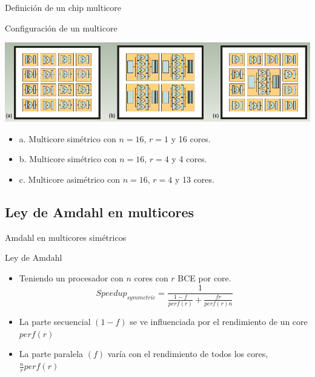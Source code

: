 \documentclass[utf8]{beamer}
\begin{document}
\begin{frame}[allowframebreaks]{Definición de un chip multicore}
\begin{block}{Configuración de un multicore}
\begin{center}
            \includegraphics[width=\linewidth]{figures/clasificacion_multicore}
        \end{center}
        \begin{itemize}
            \item a. Multicore simétrico con $n=16$, $r=1$ y 16 cores.
            \item b. Multicore simétrico con $n=16$, $r=4$ y 4 cores.
            \item c. Multicore asimétrico con $n=16$, $r=4$ y 13 cores.
        \end{itemize}
    \end{block}
\end{frame}

\subsection*{Ley de Amdahl en multicores}

\begin{frame}{Amdahl en multicores simétricos}
    \begin{block}{Ley de Amdahl}
        \begin{itemize}
        \item Teniendo un procesador con $n$ cores con $r$ BCE por core.
        $$ Speedup_{symmetric} = \frac{1}{\frac{1 - f}{perf(r)} + \frac{f  r}{perf(r)  n}} $$
        \item La parte secuencial $(1 - f)$ se ve influenciada por el rendimiento de un core $perf(r)$
        \item La parte paralela $(f)$ varía con el rendimiento de todos los cores, $\frac{n}{r}perf(r)$
        \end{itemize}
    \end{block}
\end{frame}
\end{document}
